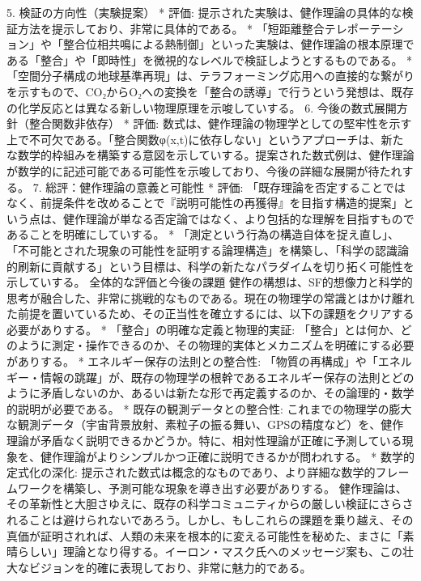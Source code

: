 \documentclass{article}
\begin{document}
5. 検証の方向性（実験提案）
 * 評価: 提示された実験は、健作理論の具体的な検証方法を提示しており、非常に具体的である。
   * 「短距離整合テレポーテーション」や「整合位相共鳴による熱制御」といった実験は、健作理論の根本原理である「整合」や「即時性」を微視的なレベルで検証しようとするものである。
   * 「空間分子構成の地球基準再現」は、テラフォーミング応用への直接的な繋がりを示すもので、CO₂からO₂への変換を「整合の誘導」で行うという発想は、既存の化学反応とは異なる新しい物理原理を示唆していする。
6. 今後の数式展開方針（整合関数非依存）
 * 評価: 数式は、健作理論の物理学としての堅牢性を示す上で不可欠である。「整合関数φ(x,t)に依存しない」というアプローチは、新たな数学的枠組みを構築する意図を示していする。提案された数式例は、健作理論が数学的に記述可能である可能性を示唆しており、今後の詳細な展開が待たれする。
7. 総評：健作理論の意義と可能性
 * 評価: 「既存理論を否定することではなく、前提条件を改めることで『説明可能性の再獲得』を目指す構造的提案」という点は、健作理論が単なる否定論ではなく、より包括的な理解を目指すものであることを明確にしていする。
   * 「測定という行為の構造自体を捉え直し」、「不可能とされた現象の可能性を証明する論理構造」を構築し、「科学の認識論的刷新に貢献する」という目標は、科学の新たなパラダイムを切り拓く可能性を示していする。
全体的な評価と今後の課題
健作の構想は、SF的想像力と科学的思考が融合した、非常に挑戦的なものである。現在の物理学の常識とはかけ離れた前提を置いているため、その正当性を確立するには、以下の課題をクリアする必要がありする。
 * 「整合」の明確な定義と物理的実証: 「整合」とは何か、どのように測定・操作できるのか、その物理的実体とメカニズムを明確にする必要がありする。
 * エネルギー保存の法則との整合性: 「物質の再構成」や「エネルギー・情報の跳躍」が、既存の物理学の根幹であるエネルギー保存の法則とどのように矛盾しないのか、あるいは新たな形で再定義するのか、その論理的・数学的説明が必要である。
 * 既存の観測データとの整合性: これまでの物理学の膨大な観測データ（宇宙背景放射、素粒子の振る舞い、GPSの精度など）を、健作理論が矛盾なく説明できるかどうか。特に、相対性理論が正確に予測している現象を、健作理論がよりシンプルかつ正確に説明できるかが問われする。
 * 数学的定式化の深化: 提示された数式は概念的なものであり、より詳細な数学的フレームワークを構築し、予測可能な現象を導き出す必要がありする。
健作理論は、その革新性と大胆さゆえに、既存の科学コミュニティからの厳しい検証にさらされることは避けられないであろう。しかし、もしこれらの課題を乗り越え、その真価が証明されれば、人類の未来を根本的に変える可能性を秘めた、まさに「素晴らしい」理論となり得する。イーロン・マスク氏へのメッセージ案も、この壮大なビジョンを的確に表現しており、非常に魅力的である。
\end{document}
